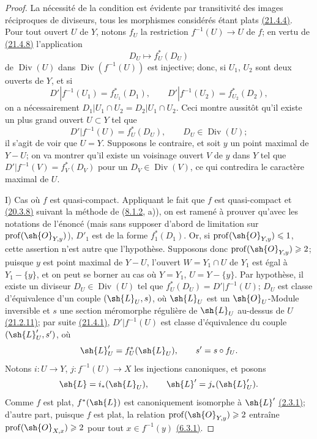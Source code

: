 \begin{proof}
La nécessité de la condition est évidente par transitivité des images
réciproques de diviseurs, tous les morphismes considérés étant plats
{\hyperlink{ega4.c04.statement.21-4-4}{(21.4.4)}}. Pour tout ouvert
$U$ de $Y$, notons $f_U$ la restriction $f^{-1}(U)\to U$ de $f$; en
vertu de {\hyperlink{ega4.c04.prop.21-4-8}{(21.4.8)}} l'application
\[
 D_U\longmapsto f_U^*(D_U)
\]
de $\operatorname{Div}(U)$ dans $\operatorname{Div}(f^{-1}(U))$ est
injective; donc, si $U_1$, $U_2$ sont deux ouverts de $Y$, et si
\[
 D'|f^{-1}(U_1)=f_{U_1}^*(D_1),\qquad
 D'|f^{-1}(U_2)=f_{U_2}^*(D_2),
\]
on a nécessairement
$D_1|U_1\cap U_2=D_2|U_1\cap U_2$. Ceci montre aussitôt qu'il existe
un plus grand ouvert $U\subset Y$ tel que
\[
 D'|f^{-1}(U)=f_U^*(D_U),
 \qquad D_U\in\operatorname{Div}(U);
\]
il s'agit de voir que $U=Y$. Supposons le contraire, et soit $y$ un
point maximal de $Y-U$; on va montrer qu'il existe un voisinage ouvert
$V$ de $y$ dans $Y$ tel que
$D'|f^{-1}(V)=f_V^*(D_V)$ pour un $D_V\in\operatorname{Div}(V)$, ce qui
contredira le caractère maximal de $U$.

\textup{I) Cas où $f$ est quasi-compact.} Appliquant le fait que $f$
est quasi-compact et {\hyperlink{ega4.c04.prop.20-3-8}{(20.3.8)}}
suivant la méthode de ({\hyperlink{ega4.c04.statement.8-1-2}{8.1.2}},
a)), on est ramené à prouver qu'avec les notations de l'énoncé (mais
sans supposer d'abord de limitation sur
$\operatorname{prof}(\sh{O}_{Y,y})$), $D'_1$ est de la forme
$f_1^*(D_1)$. Or, si $\operatorname{prof}(\sh{O}_{Y,y})\leq1$, cette
assertion n'est autre que l'hypothèse. Supposons donc
$\operatorname{prof}(\sh{O}_{Y,y})\geq2$; puisque $y$ est point maximal
de $Y-U$, l'ouvert $W=Y_1\cap U$ de $Y_1$ est égal à $Y_1-\{y\}$, et
on peut se borner au cas où $Y=Y_1$, $U=Y-\{y\}$. Par hypothèse, il
existe un diviseur $D_U\in\operatorname{Div}(U)$ tel que
$f_U^*(D_U)=D'|f^{-1}(U)$; $D_U$ est classe d'équivalence d'un couple
$(\sh{L}_U,s)$, où $\sh{L}_U$ est un $\sh{O}_U$-Module inversible et
$s$ une section méromorphe régulière de $\sh{L}_U$ au-dessus de $U$
{\hyperlink{ega4.c04.prop.21-2-11}{(21.2.11)}}; par suite
{\hyperlink{ega4.c04.statement.21-4-1}{(21.4.1)}},
$D'|f^{-1}(U)$ est classe d'équivalence du couple
$(\sh{L}'_U,s')$, où
\[
 \sh{L}'_U=f_U^*(\sh{L}_U),\qquad s'=s\circ f_U.
\]
Notons $i:U\to Y$, $j:f^{-1}(U)\to X$ les injections canoniques, et
posons
\[
 \sh{L}=i_*(\sh{L}_U),\qquad
 \sh{L}'=j_*(\sh{L}'_U).
\]
Comme $f$ est plat, $f^*(\sh{L})$ est canoniquement isomorphe à
$\sh{L}'$ {\hyperlink{ega4.c04.lem.2-3-1}{(2.3.1)}}; d'autre part,
puisque $f$ est plat, la relation
$\operatorname{prof}(\sh{O}_{Y,y})\geq2$ entraîne
$\operatorname{prof}(\sh{O}_{X,x})\geq2$ pour tout $x\in f^{-1}(y)$
{\hyperlink{ega4.c04.prop.6-3-1}{(6.3.1)}}.


\end{proof}
